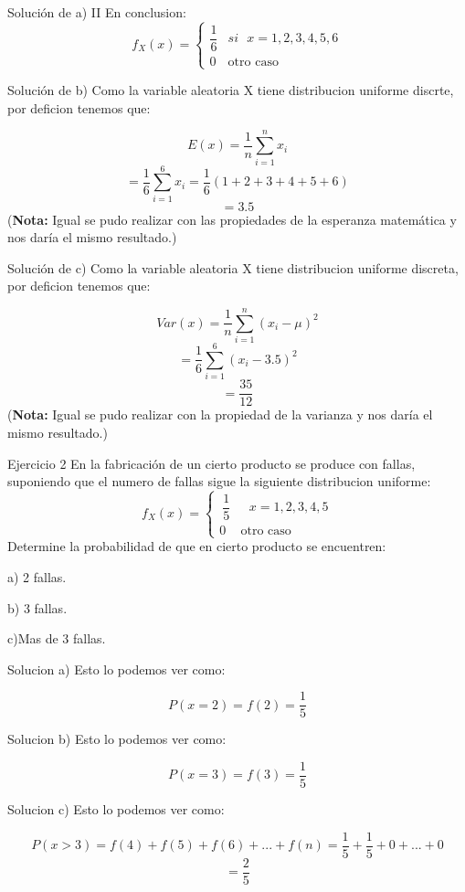 \documentclass[11pt]{beamer}
\begin{document}
\begin{frame} {Solución de a) II}
En conclusion:
$$
f_{X} (x)=\begin{cases}
{\dfrac{1}{6}} & si \mbox{ $x= 1,2 ,3, 4, 5, 6$}\\{0 }& \mbox{otro caso}\
\end{cases}
$$
\end{frame}

\begin{frame}{Solución de b)}
Como la variable aleatoria X tiene distribucion uniforme discrte, por deficion tenemos que:

        $$E(x)=\dfrac{1}{n}\sum_{i=1}^{n}x_{i}$$
        $$=\dfrac{1}{6}\sum_{i=1}^{6}x_{i}=\dfrac{1}{6}(1+2+3+4+5+6)$$
        $$=3.5$$
(\textbf{Nota:} Igual se pudo realizar con las propiedades de la esperanza matemática y nos daría el mismo resultado.)
\end{frame}
\begin{frame}{Solución de c)}
Como la variable aleatoria X tiene distribucion uniforme discreta, por deficion tenemos que:

        $$Var(x)=\dfrac{1}{n}\sum_{i=1}^{n}(x_{i}-\mu)^{2}$$
        $$=\dfrac{1}{6}\sum_{i=1}^{6}(x_{i}-3.5)^{2}$$
        $$=\dfrac{35}{12}$$
(\textbf{Nota:} Igual se pudo realizar con la propiedad de la varianza y nos daría el mismo resultado.)
\end{frame} 

\begin{frame}{Ejercicio 2}
En la fabricación de un cierto producto se produce con fallas, suponiendo que el numero de fallas sigue la siguiente distribucion uniforme:
$$
f_{X} (x)=\begin{cases}
\ {\dfrac{1}{5}} &\mbox{ $x=1,2,3,4,5$}\\ {0} &\mbox{otro caso}\
\end{cases}
$$
Determine la probabilidad de que en cierto producto se encuentren: 

a) 2 fallas.

b) 3 fallas.

c)Mas de 3 fallas.

\end{frame} 
 
\begin{frame}{Solucion a)}
Esto lo podemos ver como:

$$P(x=2)=f(2)=\frac{1}{5}$$

\end{frame} 

\begin{frame}{Solucion b)}
Esto lo podemos ver como:

$$P(x=3)=f(3)=\frac{1}{5}$$


\end{frame} 

\begin{frame}{Solucion c)}
Esto lo podemos ver como:

$$P(x>3)=f(4)+f(5)+f(6)+...+f(n)=\frac{1}{5}+\frac{1}{5}+0+...+0$$
$$=\frac{2}{5}$$


\end{frame}  
 
\end{document}
